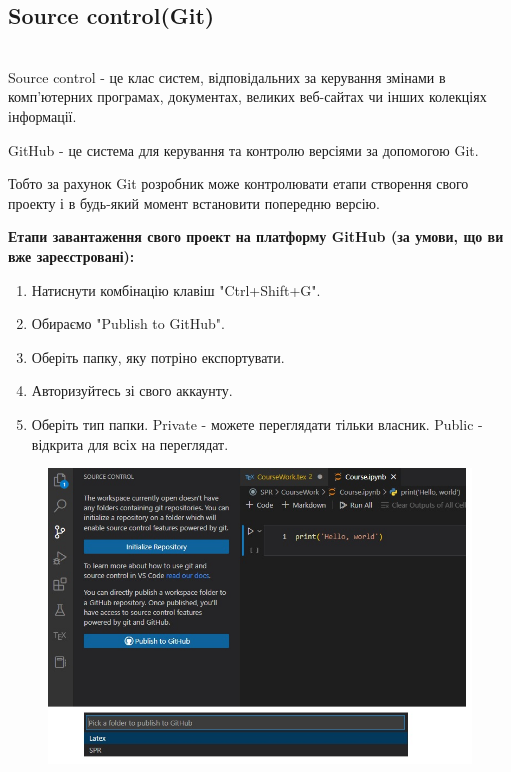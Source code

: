 \documentclass[a4paper,12pt]{article}
\begin{document}
    \subsection {Source control(Git)}
    \hrulefill \\

    Source control - це клас систем, відповідальних за керування змінами в комп’ютерних програмах, документах, великих веб-сайтах чи інших колекціях інформації. 

    GitHub - це система для керування та контролю версіями за допомогою Git.

    Тобто за рахунок Git розробник може контролювати етапи створення свого проекту і в будь-який момент встановити попередню версію.
    \begin{center}
        \textbf{Етапи завантаження свого проект на платформу GitHub (за умови, що ви вже зареєстровані):}
    \end{center}
    \begin{enumerate}
        \item Натиснути комбінацію клавіш "Ctrl+Shift+G".
        \item Обираємо "Publish to GitHub".
        \item Оберіть папку, яку потріно експортувати.
        \item Авторизуйтесь зі свого аккаунту.
        \item Оберіть тип папки. Private - можете переглядати тільки власник. Public - відкрита для всіх на переглядат.
    \end{enumerate}
    \begin{figure}[h!]
        \begin{center}
            \includegraphics[scale=0.8]{Prt sc/Figure_7.jpg}
        \end{center}
    \end{figure}
\end{document}

